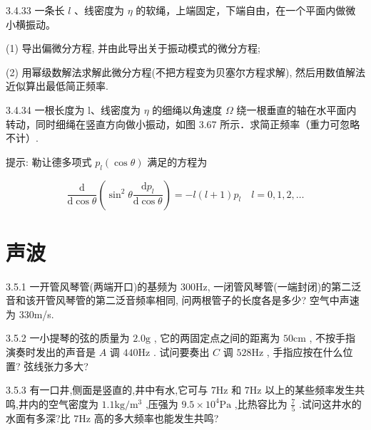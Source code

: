 \begin{problem}{3.4.33}
一条长 $l$ 、线密度为 $\eta$ 的软绳，上端固定，下端自由，在一个平面内做微小横振动。

(1) 导出偏微分方程, 并由此导出关于振动模式的微分方程;

(2) 用幂级数解法求解此微分方程(不把方程变为贝塞尔方程求解), 然后用数值解法近似算出最低简正频率.
\end{problem}
\clearpage


\begin{problem}{3.4.34}
一根长度为 l、线密度为 $\eta$ 的细绳以角速度 $\Omega$ 绕一根垂直的轴在水平面内转动，同时细绳在竖直方向做小振动，如图 3.67 所示．求简正频率（重力可忽略不计）.

提示: 勒让德多项式 $p_{l}(\cos\theta)$ 满足的方程为

\[
\frac {\mathrm{d}}{\mathrm{d} \cos \theta} \left(\sin^ {2} \theta \frac {\mathrm{d} p _ {l}}{\mathrm{d} \cos \theta}\right) = - l (l + 1) p _ {l} \quad l = 0, 1, 2, \dots
\]
\begin{center}

\end{center}
\end{problem}
\clearpage


\section{声波}

\begin{problem}{3.5.1}
一开管风琴管(两端开口)的基频为 300Hz, 一闭管风琴管(一端封闭)的第二泛音和该开管风琴管的第二泛音频率相同, 问两根管子的长度各是多少? 空气中声速为 330m/s.
\end{problem}
\clearpage


\begin{problem}{3.5.2}
一小提琴的弦的质量为 $2.0\mathrm{g}$ , 它的两固定点之间的距离为 $50\mathrm{cm}$ , 不按手指演奏时发出的声音是 $A$ 调 $440\mathrm{Hz}$ . 试问要奏出 $C$ 调 $528\mathrm{Hz}$ , 手指应按在什么位置? 弦线张力多大?
\end{problem}
\clearpage


\begin{problem}{3.5.3}
有一口井,侧面是竖直的,井中有水,它可与 $7\mathrm{Hz}$ 和 $7\mathrm{Hz}$ 以上的某些频率发生共鸣,井内的空气密度为 $1.1\mathrm{kg} / \mathrm{m}^3$ ,压强为 $9.5\times 10^{4}\mathrm{Pa}$ ,比热容比为 $\frac{7}{5}$ .试问这井水的水面有多深?比 $7\mathrm{Hz}$ 高的多大频率也能发生共鸣?
\end{problem}
\clearpage


